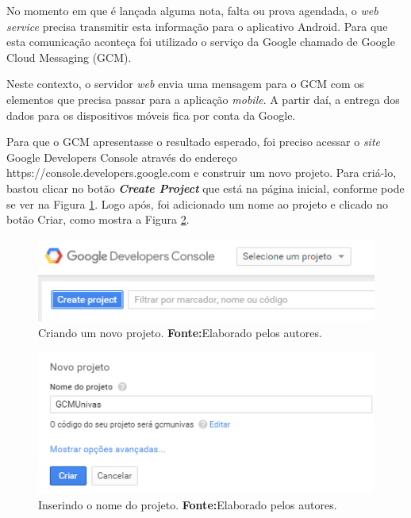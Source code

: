 
	\par No momento em que é lançada alguma nota, falta ou prova agendada, o
\textit{web service} precisa transmitir esta informação para o aplicativo
Android. Para que esta comunicação aconteça foi utilizado o serviço da Google
chamado de Google Cloud Messaging (GCM).

	\par Neste contexto, o servidor \textit{web} envia uma mensagem para o GCM com
os elementos que precisa passar para a aplicação \textit{mobile}. A partir daí,
a entrega dos dados para os dispositivos móveis fica por conta da Google.

	\par Para que o GCM apresentasse o resultado esperado, foi preciso acessar o
\textit{site} Google Developers Console através do endereço
https://console.developers.google.com e construir um novo projeto. Para
criá-lo, bastou clicar no botão \textbf{\textit{Create Project}} que está na
página inicial, conforme pode se ver na Figura \ref{fig:gcm}. Logo após, foi
adicionado um nome ao projeto e clicado no botão Criar, como mostra a Figura
\ref{fig:gcm1}.
	
	\begin{figure}[h!] 
		\centerline{\includegraphics[scale=1]{./imagens/2_q_metodologico/4_procedimentos_resultados/41_gcm/gcm.png}}
		\caption[Criando um novo projeto]{Criando um novo projeto.
		\textbf{Fonte:}Elaborado pelos autores.}
		\label{fig:gcm}
	\end{figure}
	
	\pagebreak
	

	\begin{figure}[h!] 
		\centerline{\includegraphics[scale=1]{./imagens/2_q_metodologico/4_procedimentos_resultados/41_gcm/gcm1.png}}
		\caption[Inserindo o nome do projeto.]{Inserindo o nome do projeto.
		\textbf{Fonte:}Elaborado pelos autores.}
		\label{fig:gcm1}
	\end{figure}
	
